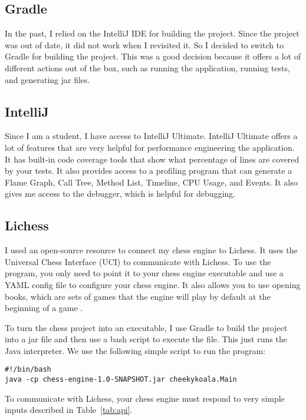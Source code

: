 \documentclass[sigconf]{acmart}
\begin{document}
\subsection{Gradle}
In the past, I relied on the IntelliJ IDE for building the project.
Since the project was out of date, it did not work when I revisited it.
So I decided to switch to Gradle for building the project.
This was a good decision because it offers a lot of different actions out of the box, such as running the application, running tests, and generating jar files.

\subsection{IntelliJ}
Since I am a student, I have access to IntelliJ Ultimate. IntelliJ Ultimate offers a lot of features that are very helpful for performance engineering the application.
It has built-in code coverage tools that show what percentage of lines are covered by your tests.
It also provides access to a profiling program that can generate a Flame Graph, Call Tree, Method List, Timeline, CPU Usage, and Events.
It also gives me access to the debugger, which is helpful for debugging.

\subsection{Lichess}
I used an open-source resource \cite{lichess-bot} to connect my chess engine to Lichess.
It uses the Universal Chess Interface (UCI) \cite{uci} to communicate with Lichess.
To use the program, you only need to point it to your chess engine executable and use a YAML config file to configure your chess engine.
It also allows you to use opening books, which are sets of games that the engine will play by default at the beginning of a game \cite{pgn}.

To turn the chess project into an executable, I use Gradle to build the project into a jar file and then use a bash script to execute the file.
This just runs the Java interpreter.
We use the following simple script to run the program:
\begin{verbatim}
#!/bin/bash
java -cp chess-engine-1.0-SNAPSHOT.jar cheekykoala.Main
\end{verbatim}
To communicate with Lichess, your chess engine must respond to very simple inputs described in Table~\ref{tab:api}.
\end{document}
